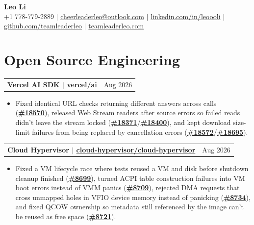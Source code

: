 \documentclass[letterpaper,11pt]{article}
\makeatletter
\newcommand{\resumeHeadingSimple}[2]{%
  \begin{tabularx}{\textwidth}{@{}Xr@{}}
    \textbf{#1} & #2
  \end{tabularx}\vspace{-0.25pt}
}
\newcommand{\resumeItemListStart}{\begin{itemize}[leftmargin=0.23in,itemsep=0.8pt,parsep=0pt,topsep=0.6pt]}
\newcommand{\resumeItem}[1]{\item\fontsize{10.2pt}{11.7pt}\selectfont #1}
\newcommand{\resumeItemListEnd}{\end{itemize}\vspace{-0.25pt}}
\makeatother
\begin{document}
\begin{center}
  {\Huge\textbf{Leo Li}} \\[2pt]
  \small
  +1 778-779-2889 $|$
  \href{mailto:cheerleaderleo@outlook.com}{cheerleaderleo@outlook.com} $|$
  \href{https://www.linkedin.com/in/leoooli/}{linkedin.com/in/leoooli} $|$
  \href{https://github.com/teamleaderleo}{github.com/teamleaderleo} $|$
  \href{https://teamleaderleo.com/}{teamleaderleo.com}
\end{center}
\vspace{-10pt}

\section{Open Source Engineering}

\resumeHeadingSimple
  {Vercel AI SDK $|$ \href{https://redirect.github.com/vercel/ai}{vercel/ai}}
  {Aug 2026}
\resumeItemListStart
  \resumeItem{Fixed identical URL checks returning different answers across calls (\href{https://redirect.github.com/vercel/ai/pull/18570}{\textbf{\#18570}}), released Web Stream readers after source errors so failed reads didn't leave the stream locked (\href{https://redirect.github.com/vercel/ai/pull/18371}{\textbf{\#18371}}/\href{https://redirect.github.com/vercel/ai/pull/18400}{\textbf{\#18400}}), and kept download size-limit failures from being replaced by cancellation errors (\href{https://redirect.github.com/vercel/ai/pull/18572}{\textbf{\#18572}}/\href{https://redirect.github.com/vercel/ai/pull/18695}{\textbf{\#18695}}).}
\resumeItemListEnd

\resumeHeadingSimple
  {Cloud Hypervisor $|$ \href{https://redirect.github.com/cloud-hypervisor/cloud-hypervisor}{cloud-hypervisor/cloud-hypervisor}}
  {Aug 2026}
\resumeItemListStart
  \resumeItem{Fixed a VM lifecycle race where tests reused a VM and disk before shutdown cleanup finished (\href{https://redirect.github.com/cloud-hypervisor/cloud-hypervisor/pull/8699}{\textbf{\#8699}}), turned ACPI table construction failures into VM boot errors instead of VMM panics (\href{https://redirect.github.com/cloud-hypervisor/cloud-hypervisor/pull/8709}{\textbf{\#8709}}), rejected DMA requests that cross unmapped holes in VFIO device memory instead of panicking (\href{https://redirect.github.com/cloud-hypervisor/cloud-hypervisor/pull/8734}{\textbf{\#8734}}), and fixed QCOW ownership so metadata still referenced by the image can't be reused as free space (\href{https://redirect.github.com/cloud-hypervisor/cloud-hypervisor/pull/8721}{\textbf{\#8721}}).}
\resumeItemListEnd
\end{document}
